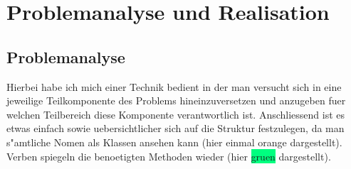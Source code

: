 \section{Problemanalyse und Realisation}
\subsection{Problemanalyse}
Hierbei habe ich mich einer Technik bedient in der man versucht sich in eine jeweilige Teilkomponente des Problems hineinzuversetzen und anzugeben fuer welchen Teilbereich diese Komponente verantwortlich ist. Anschliessend ist es etwas einfach sowie uebersichtlicher sich auf die Struktur festzulegen, da man s"amtliche Nomen als Klassen ansehen kann (hier einmal \colorbox{Apricot}{orange} dargestellt). Verben spiegeln die benoetigten Methoden wieder (hier \colorbox{SpringGreen}{gruen} dargestellt).

